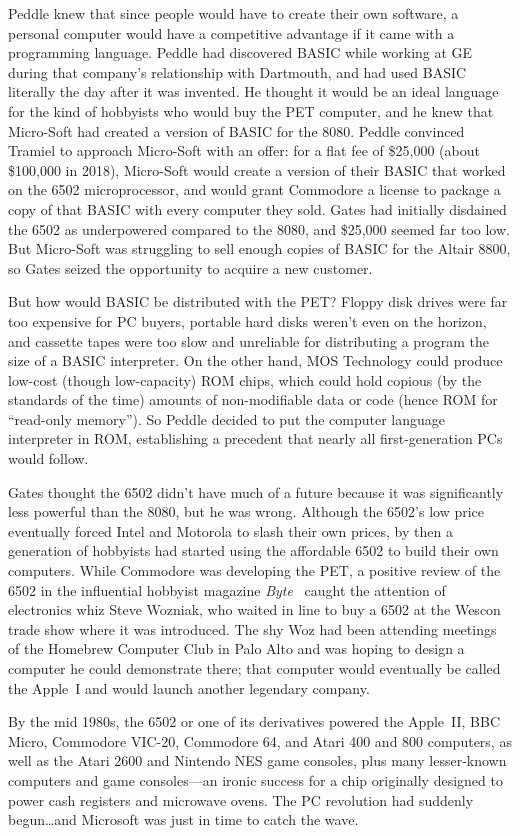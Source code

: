 Peddle knew that since people would have to create their own software,
a personal computer would have a competitive advantage if it came with
a programming language.
Peddle had discovered BASIC while working at GE during that company's
relationship with Dartmouth, and had used BASIC literally the day
after it was invented.
He thought it would be an ideal language for the kind of hobbyists
who would buy the PET computer, and he knew that Micro-Soft had
created a version of BASIC for the 8080.
Peddle convinced Tramiel to approach Micro-Soft with an offer: for a
flat fee of \$25,000 (about \$100,000 in 2018), Micro-Soft would
create a version of their BASIC that worked on the 6502
microprocessor, and would grant Commodore a license to package a copy
of that BASIC with every computer they sold.
Gates had initially disdained the 6502 as underpowered compared to the
8080, and \$25,000 seemed far too low.
But Micro-Soft was struggling to sell enough copies of BASIC for the
Altair 8800, so Gates seized the opportunity to acquire a new
customer.

But how would BASIC be distributed with the PET?
Floppy disk drives were far too expensive for PC buyers, portable
hard disks weren't even on the horizon, and cassette tapes were too
slow and unreliable for distributing a program the size of a BASIC
interpreter.
On the other hand, MOS Technology could produce low-cost (though
low-capacity) ROM chips, which could hold copious (by the standards of
the time) amounts of non-modifiable data or code (hence ROM for
``read-only memory'').
So Peddle decided to put the computer language interpreter in ROM,
establishing a precedent that nearly all first-generation PCs would
follow.


Gates thought the 6502 didn't have much of a future because it was
significantly less powerful than the 8080, but he was wrong.
Although the 6502's low price eventually forced Intel and Motorola to
slash their own prices, by then a generation of hobbyists had started
using the affordable 6502 to build their own computers.
While Commodore was developing the PET, a positive review of the 6502
in the influential hobbyist magazine \emph{Byte}~\cite{byte75:6502}
caught the attention of electronics whiz Steve Wozniak, who waited in
line to buy a 6502 at the Wescon trade show where it was introduced.
The shy Woz had been attending meetings of the Homebrew Computer Club
in Palo Alto and was hoping to design a computer he could demonstrate
there; that computer would eventually be called the Apple~I and would
launch another legendary company.

By the mid 1980s, the 6502 or one of its derivatives powered the
Apple~II, BBC Micro, Commodore VIC-20, Commodore 64, and Atari 400 and
800 computers, as well as the Atari 2600 and Nintendo NES game
consoles, plus many lesser-known computers and game consoles---an
ironic success for a chip originally designed to power cash registers
and microwave ovens.
The PC revolution had suddenly begun\ldots{}and Microsoft was just in
time to catch the wave.


